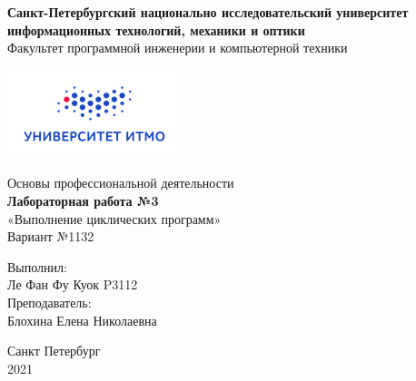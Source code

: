 \begin{center}
\textbf{\large{Санкт-Петербургский национально исследовательский университет}}\\
\textbf{\large{информационных технологий, механики и оптики}}\\
\large{Факультет программной инженерии и компьютерной техники}\\
\end{center}
\begin{center}
\includegraphics{img/Itmologo.png}
\end{center}
\begin{center}
\vspace{5cm}
\large{Основы профессиональной деятельности} \\
\textbf{\large{Лабораторная работа №3}}\\
\large{«Выполнение циклических программ»\\
Вариант №1132}\\
\end{center}
\vspace{5cm}
\begin{flushright}
Выполнил: \\
Ле Фан Фу Куок P3112 \\
Преподаватель: \\
Блохина Елена Николаевна \\
\end{flushright}
\thispagestyle{empty}
\vfill
\begin{center} 
Санкт Петербург\\
2021
\end{center}
